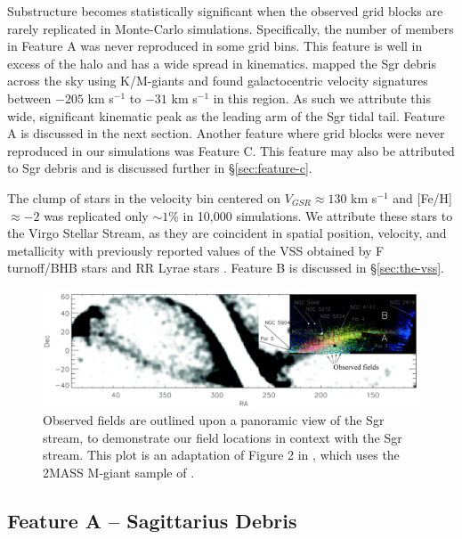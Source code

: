 \documentclass[preprint2]{aastex}
\begin{document}
	 Substructure becomes statistically significant when the observed grid blocks are rarely replicated in Monte-Carlo simulations. Specifically, the number of members in Feature A was never reproduced in some grid bins. This feature is well in excess of the halo and has a wide spread in kinematics. \citet{Chou;et-al_2007} mapped the Sgr debris across the sky using K/M-giants and found galactocentric velocity signatures between $-205$ km s$^{-1}$ to $-31$ km s$^{-1}$ in this region. As such we attribute this wide, significant kinematic peak as the leading arm of the Sgr tidal tail. Feature A is discussed in the next section. Another feature where grid blocks were never reproduced in our simulations was Feature C. This feature may also be attributed to Sgr debris and is discussed further in \S\ref{sec:feature-c}.
	 	
	 The clump of stars in the velocity bin centered on $V_{GSR} \approx 130$ km s$^{-1}$ and [Fe/H] $\approx -2$ was replicated only $\sim1$\% in 10,000 simulations. We attribute these stars to the Virgo Stellar Stream, as they are coincident in spatial position, velocity, and metallicity with previously reported values of the VSS obtained by F turnoff/BHB stars \citep{Newberg;et-al_2007} and RR Lyrae stars \citep{Prior;et-al_2009a}. Feature B is discussed in \S\ref{sec:the-vss}.

	\begin{figure}[h]
		\includegraphics[width=\columnwidth]{./adapted_belokurov_2006.eps}
		\caption{Observed fields are outlined upon a panoramic view of the Sgr stream, to demonstrate our field locations in context with the Sgr stream. This plot is an adaptation of Figure 2 in \citet{Belokurov;et-al_2006}, which uses the 2MASS M-giant sample of \citet{Majewski;et-al_2003}.}
		\label{fig:sgr-field-of-streams}
	\end{figure}
	
	\subsection{Feature A \--- Sagittarius Debris}
	\label{sec:sgr-debris}
	
\end{document}
